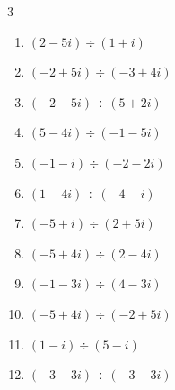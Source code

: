 \begin{multicols}{3}
\begin{enumerate}
  \item $\displaystyle (2-5i)\div(1+i)$


  \item $\displaystyle (-2+5i)\div(-3+4i)$


  \item $\displaystyle (-2-5i)\div(5+2i)$


  \item $\displaystyle (5-4i)\div(-1-5i)$


  \item $\displaystyle (-1-i)\div(-2-2i)$


  \item $\displaystyle (1-4i)\div(-4-i)$

        \phantom{$\displaystyle =i$}

  \item $\displaystyle (-5+i)\div(2+5i)$


  \item $\displaystyle (-5+4i)\div(2-4i)$


\columnbreak %

  \item $\displaystyle (-1-3i)\div(4-3i)$


  \item $\displaystyle (-5+4i)\div(-2+5i)$


  \item $\displaystyle (1-i)\div(5-i)$


  \item $\displaystyle (-3-3i)\div(-3-3i)$


\end{enumerate}
\end{multicols}
